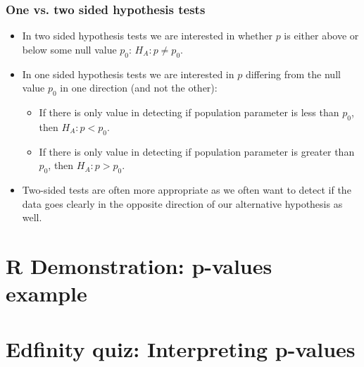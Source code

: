 \documentclass[t,compress,mathserif]{beamer}
\begin{document}
\begin{frame}
\frametitle{One vs. two sided hypothesis tests}

\begin{itemize}

\item In two sided hypothesis tests we are interested in whether $p$ is either above or below some null value $p_0$: $H_A: p \ne p_0$.

\item In one sided hypothesis tests we are interested in $p$ differing from the null value $p_0$ in one direction (and not the other):
\begin{itemize}
\item If there is only value in detecting if population parameter is less than $p_0$, then $H_A: p < p_0$.
\item If there is only value in detecting if population parameter is greater than $p_0$, then $H_A: p > p_0$.
\end{itemize}

\item Two-sided tests are often more appropriate as we often want to detect if the data goes clearly in the opposite direction of our alternative hypothesis as well.

\end{itemize}

\end{frame}


\section{R Demonstration: p-values example}


\section{Edfinity quiz: Interpreting p-values}

\end{document}
